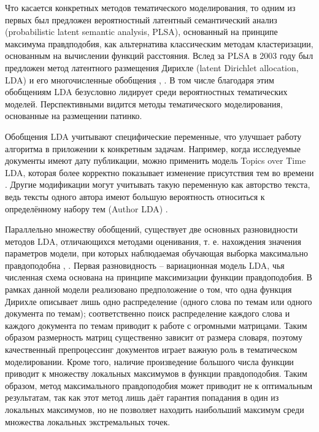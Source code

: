 Что касается конкретных методов тематического моделирования, то одним из первых был предложен вероятностный латентный семантический анализ (probabilistic latent semantic analysis, PLSA), основанный на принципе максимума правдподобия, как альтернатива классическим методам кластеризации, основанным на вычислении функций расстояния. Вслед за PLSA в 2003 году был предложен метод латентного размещения Дирихле (latent Dirichlet allocation, LDA) \cite{LDAOrigin} и его многочисленные обобщения \cite{NeedlesInAHaystack}, \cite{LDASurvey}. В том числе благодаря этим обобщениям LDA безусловно лидирует среди вероятностных тематических моделей. Перспективными видится методы тематического моделирования, основанные на размещении патинко.

Обобщения LDA учитывают специфические переменные, что улучшает работу алгоритма в приложении к конкретным задачам. Например, когда исследуемые документы имеют дату публикации, можно применить модель Topics over Time LDA, которая более корректно показывает изменение присутствия тем во времени \cite{ToTLDA}. Другие модификации могут учитывать такую переменную как авторство текста, ведь тексты одного автора имеют большую вероятность относиться к определённому набору тем (Author LDA) \cite{authorLDA}.

Параллельно множеству обобщений, существует две основных разновидности методов LDA, отличающихся методами оценивания, т. е. нахождения значения параметров модели, при которых наблюдаемая обучающая выборка максимально правдоподобна \cite{kolcovaJJ}, \cite[стр. 1]{HoffmanBB10}. Первая разновидность -- вариационная модель LDA, чья численная схема основана на принципе максимизации функции правдоподобия. В рамках данной модели реализовано предположение о том, что одна функция Дирихле описывает лишь одно распределение (одного слова по темам или одного документа по темам); соответственно поиск распределение каждого слова и каждого документа по темам приводит к работе с огромными матрицами. Таким образом размерность матриц существенно зависит от размера словаря, поэтому качественный препроцессинг документов играет важную роль в тематическом моделировании. Кроме того, наличие произведение большого числа функции приводит к множеству локальных максимумов в функции правдоподобия. Таким образом, метод максимального правдоподобия может приводит не к оптимальным результатам, так как этот метод лишь даёт гарантия попадания в один из локальных максимумов, но не позволяет находить наибольший максимум среди множества локальных экстремальных точек.


